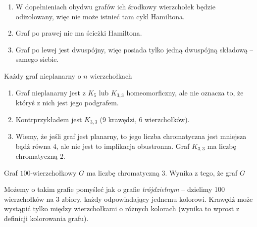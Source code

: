 \begin{solutions}
\begin{center}
    \end{center}

    \begin{enumerate}[\bf A.]
        \item W dopełnieniach obydwu grafów ich środkowy wierzchołek będzie odizolowany, więc nie może istnieć tam cykl Hamiltona.

        \item Graf po prawej nie ma ścieżki Hamiltona.

        \item Graf po lewej jest dwuspójny, więc posiada tylko jedną dwuspójną składową -- samego siebie.
    \end{enumerate}

    \sol Każdy graf nieplanarny o $n$ wierzchołkach
    \begin{enumerate}[\bf A.]
        \item Graf nieplanarny jest z $K_5$ lub $K_{3,3}$ homeomorficzny, ale nie oznacza to, że któryś z nich jest jego podgrafem.
        \item Kontrprzykładem jest $K_{3, 3}$ (9 krawędzi, 6 wierzchołków).
        \item Wiemy, że jeśli graf jest planarny, to jego liczba chromatyczna jest mniejsza bądź równa 4, ale nie jest to implikacja obustronna. Graf $K_{3,3}$ ma liczbę chromatyczną $2$.
    \end{enumerate}

    \sol Graf $100$-wierzchołkowy $G$ ma liczbę chromatyczną $3$. Wynika z tego, że graf $G$

    Możemy o takim grafie pomyśleć jak o grafie \textit{trójdzielnym} -- dzielimy 100 wierzchołków na 3 zbiory, każdy odpowiadający jednemu kolorowi. Krawędź może wystąpić tylko między wierzchołkami o różnych kolorach (wynika to wprost z definicji kolorowania grafu).


\end{solutions}
